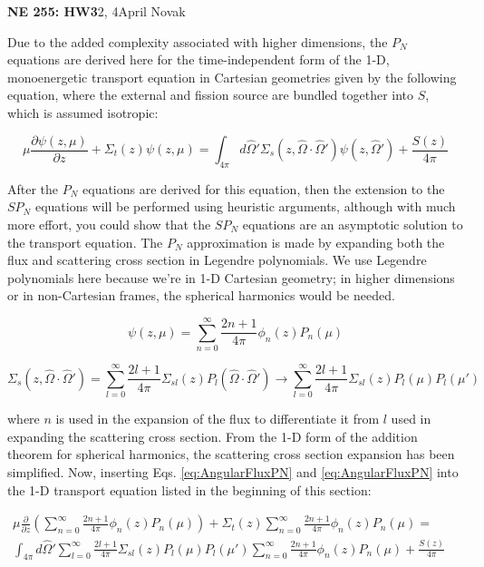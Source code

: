 \documentclass[10pt]{article}
\newcommand*\circled[1]{\tikz[baseline=(char.base)]{
            \node[shape=circle,draw,inner sep=2pt] (char) {#1};}}
\begin{document}
\textbf{NE 255: HW3}2, 4\hfill April Novak\newline

\circled{1} Due to the added complexity associated with higher dimensions, the \(P_N\) equations are derived here for the time-independent form of the 1-D, monoenergetic transport equation in Cartesian geometries given by the following equation, where the external and fission source are bundled together into \(S\), which is assumed isotropic:

\begin{equation*}
\mu \frac{\partial \psi(z, \mu)}{\partial z} +
 \Sigma_t(z)\psi(z, \mu) =\int_{4\pi}^{} d\hat{\Omega}' \Sigma_s(z, \hat{\Omega}\cdot\hat{\Omega}')\psi(z,\hat{\Omega}') + \frac{S(z)}{4\pi}
 \end{equation*}

After the \(P_N\) equations are derived for this equation, then the extension to the \(SP_N\) equations will be performed using heuristic arguments, although with much more effort, you could show that the \(SP_N\) equations are an asymptotic solution to the transport equation. The \(P_N\) approximation is made by expanding both the flux and scattering cross section in Legendre polynomials. We use Legendre polynomials here because we're in 1-D Cartesian geometry; in higher dimensions or in non-Cartesian frames, the spherical harmonics would be needed.

\begin{equation}
\label{eq:AngularFluxPN}
\psi(z,\mu)=\sum_{n=0}^{\infty}\frac{2n+1}{4\pi}\phi_n(z)P_n(\mu)
\end{equation}

\begin{equation}
\label{eq:PNScatteringCrossSectionExpansion}
\Sigma_s(z,\hat{\Omega}\cdot\hat{\Omega}')=\sum_{l=0}^{\infty}\frac{2l+1}{4\pi}\Sigma_{sl}(z)P_l(\hat{\Omega}\cdot\hat{\Omega}')\rightarrow\sum_{l=0}^{\infty}\frac{2l+1}{4\pi}\Sigma_{sl}(z)P_l(\mu)P_l(\mu')
\end{equation}

where \(n\) is used in the expansion of the flux to differentiate it from \(l\) used in expanding the scattering cross section. From the 1-D form of the addition theorem for spherical harmonics, the scattering cross section expansion has been simplified. Now, inserting Eqs. \eqref{eq:AngularFluxPN} and \eqref{eq:AngularFluxPN} into the 1-D transport equation listed in the beginning of this section:

\begin{equation}
\begin{aligned}
\mu \frac{\partial}{\partial z}\left(\sum_{n=0}^{\infty}\frac{2n+1}{4\pi}\phi_n(z)P_n(\mu)\right) + \Sigma_t(z)\sum_{n=0}^{\infty}\frac{2n+1}{4\pi}\phi_n(z)P_n(\mu) =\quad\quad\\
\int_{4\pi}^{} d\hat{\Omega}' \sum_{l=0}^{\infty}\frac{2l+1}{4\pi}\Sigma_{sl}(z)P_l(\mu)P_l(\mu')\sum_{n=0}^{\infty}\frac{2n+1}{4\pi}\phi_n(z)P_n(\mu) + \frac{S(z)}{4\pi}
 \end{aligned}
 \end{equation}
\end{document}
